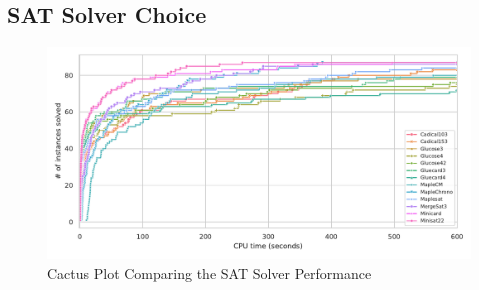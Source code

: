 \subsection{SAT Solver Choice}

\begin{figure}[htbp]
\centering
\includegraphics[scale=0.7]{Thesis/figures/minibenchmark_cactus_plot_runtime_SAT_with_holes_cf.pdf}
\caption{Cactus Plot Comparing the SAT Solver Performance}
\label{fig:cactus_SAT_simple_with_holes_cf}
\end{figure}

